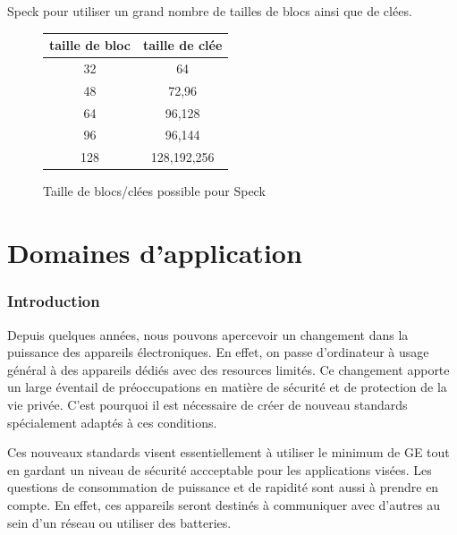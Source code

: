 			\vspace{0.3cm}

			Speck pour utiliser un grand nombre de tailles de blocs ainsi que de clées.

			\vspace{0.5cm}

			\begin{figure}[!h]
				\centering
				\begin{tabular}{cc}
					taille de bloc & taille de clée \\
					\hline
					32 & 64 \\
					\hline
					48 & 72,96 \\
					\hline
					64 & 96,128 \\
					\hline
					96 & 96,144 \\
					\hline
					128 & 128,192,256 \\
					\hline
				\end{tabular}
				\caption{Taille de blocs/clées possible pour Speck}
			 	\label{tailleSpeck}
			\end{figure}

			\vspace{0.5cm}

			\part{Domaines d'application}

			\section{Introduction}


			Depuis quelques années, nous pouvons apercevoir un changement dans la puissance des appareils électroniques.
			En effet, on passe d'ordinateur à usage général à des appareils dédiés avec des resources limités.
			Ce changement apporte un large éventail de préoccupations en matière de sécurité et de protection de la vie privée.
			C'est pourquoi il est nécessaire de créer de nouveau standards spécialement adaptés à ces conditions.
			
			Ces nouveaux standards visent essentiellement à utiliser le minimum de GE tout en gardant un niveau de sécurité accceptable pour les applications visées.
			Les questions de consommation de puissance et de rapidité sont aussi à prendre en compte.
			En effet, ces appareils seront destinés à communiquer avec d'autres au sein d'un réseau ou utiliser des batteries.
			
